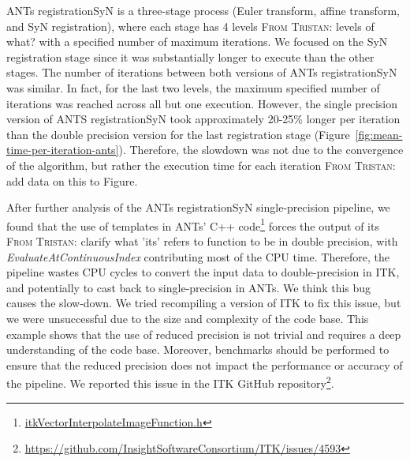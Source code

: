 \documentclass[conference]{IEEEtran}
\newcommand{\TG}[1]{\color{blue}\textsc{From Tristan: }#1\color{black}}
\begin{document}
ANTs registrationSyN is a three-stage process (Euler transform, affine transform, and SyN registration), where each stage has 4 levels \TG{levels of what?} with a specified number of maximum iterations. We focused on the SyN registration stage since it was substantially longer to execute than the other stages. The number of iterations between both versions of ANTs registrationSyN was similar. In fact, for the last two levels, the maximum specified number of iterations was reached across all but one execution. However, the single precision version of ANTS registrationSyN took approximately 20-25\% longer per iteration than the double precision version for the last registration stage (Figure~\ref{fig:mean-time-per-iteration-ants}). Therefore, the slowdown was not due to the convergence of the algorithm, but rather the execution time for each iteration \TG{add data on this to Figure}.

After further analysis of the ANTs registrationSyN single-precision pipeline, we found that the use of templates in ANTs' C++ code\footnote{\href{https://github.com/InsightSoftwareConsortium/ITK/blob/d9c585d96359bf304ad3047148cee81bf27ac0c1/Modules/Core/ImageFunction/include/itkVectorInterpolateImageFunction.h\#L46-L48}{itkVectorInterpolateImageFunction.h}} forces the output of its \TG{clarify what 'its' refers to} function to be in double precision, with \textit{EvaluateAtContinuousIndex} contributing most of the CPU time. Therefore, the pipeline wastes CPU cycles to convert the input data to double-precision in ITK, and potentially to cast back to single-precision in ANTs. We think this bug causes the slow-down. We tried recompiling a version of ITK to fix this issue, but we were unsuccessful due to the size and complexity of the code base. This example shows that the use of reduced precision is not trivial and requires a deep understanding of the code base. Moreover, benchmarks should be performed to ensure that the reduced precision does not impact the performance or accuracy of the pipeline. We reported this issue in the ITK GitHub repository\footnote{\href{https://github.com/InsightSoftwareConsortium/ITK/issues/4593}{https://github.com/InsightSoftwareConsortium/ITK/issues/4593}}.
\end{document}
